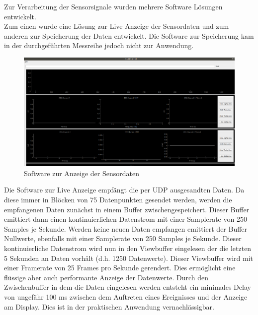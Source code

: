 Zur Verarbeitung der Sensorsignale wurden mehrere Software Lösungen entwickelt.\\

Zum einen wurde eine Lösung zur Live Anzeige der Sensordaten und zum anderen zur Speicherung der Daten entwickelt. Die Software zur Speicherung kam in der durchgeführten Messreihe jedoch nicht zur Anwendung.\\

\begin{figure}[h]
    \centering
\begin{minipage}[t]{0.9\textwidth}
\includegraphics[width=\textwidth]{Images/screenshot_liveview.png}
\end{minipage}
    \caption{Software zur Anzeige der Sensordaten}
    \label{fig:screen_sensor}
\end{figure}

Die Software zur Live Anzeige empfängt die per UDP ausgesandten Daten. Da diese immer in Blöcken von 75 Datenpunkten gesendet werden, werden die empfangenen Daten zunächst in einem Buffer zwischengespeichert. Dieser Buffer emittiert dann einen kontinuierlichen Datenstrom mit einer Samplerate von 250 Samples je Sekunde. Werden keine neuen Daten empfangen emittiert der Buffer Nullwerte, ebenfalls mit einer Samplerate von 250 Samples je Sekunde.  Dieser kontinuierliche Datenstrom wird nun in den Viewbuffer eingelesen der die letzten 5 Sekunden an Daten vorhält (d.h. 1250 Datenwerte). Dieser Viewbuffer wird mit einer Framerate von 25 Frames pro Sekunde gerendert. Dies ermöglicht eine flüssige aber auch performante Anzeige der Datenwerte. Durch den Zwischenbuffer in dem die Daten eingelesen werden entsteht ein minimales Delay von ungefähr 100 ms zwischen dem Auftreten eines Ereignisses und der Anzeige am Display. Dies ist in der praktischen Anwendung vernachlässigbar. \\

